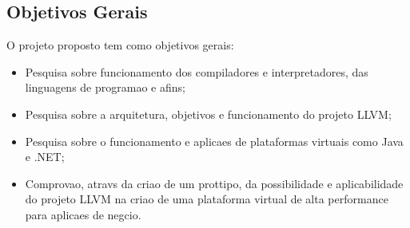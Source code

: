 \subsection{Objetivos Gerais}

\label{pro:objetivos_gerais}

O projeto proposto tem como objetivos gerais:
\begin{itemize}
  \item Pesquisa sobre funcionamento dos compiladores e interpretadores, das linguagens de programa\ca o e afins;
  \item Pesquisa sobre a arquitetura, objetivos e funcionamento do projeto LLVM;
  \item Pesquisa sobre o funcionamento e aplica\co es de plataformas virtuais como Java e .NET;
  \item Comprova\ca o, atrav\eh s da cria\ca o de um prot\oh tipo, da possibilidade e aplicabilidade do projeto LLVM na cria\ca o de uma plataforma virtual de alta performance para aplica\co es de neg\oh cio.
\end{itemize}

